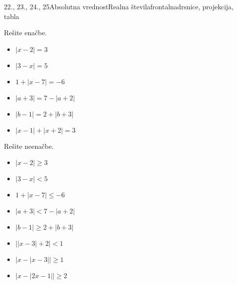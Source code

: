 \begin{priprava}{22., 23., 24., 25}{}{Absolutna vrednost}{Realna števila}{frontalna}{drsnice, projekcija, tabla}
\begin{multicols}{2}
\begin{naloga}
\begin{itemize}
    \end{itemize}
\end{naloga}


\begin{naloga}
    Rešite enačbe.
    \begin{itemize}
            \item $\left\lvert x-2 \right\rvert =3$ 
            \item $\left\lvert 3-x\right\rvert =5$ 
            \item $1+ \left\lvert x-7 \right\rvert =-6$ 
            \item $\left\lvert a+3 \right\rvert = 7- \left\lvert a+2 \right\rvert$ 
            \item $\left\lvert b-1 \right\rvert = 2 + \left\lvert b+3 \right\rvert$ 
            \item $\left\lvert x-1 \right\rvert + \left\lvert x+2 \right\rvert =3$ 

    \end{itemize}
\end{naloga}


\begin{naloga}
    Rešite neenačbe.
    \begin{itemize}
            \item $\left\lvert x-2 \right\rvert \geq 3$ 
            \item $\left\lvert 3-x\right\rvert <5$ 
            \item $1+ \left\lvert x-7 \right\rvert \leq-6$ 
            \item $\left\lvert a+3 \right\rvert < 7- \left\lvert a+2 \right\rvert$ 
            \item $\left\lvert b-1 \right\rvert \geq 2 + \left\lvert b+3 \right\rvert$ 
            \item $\left\lvert \lvert x-3\rvert +2\right\rvert <1$ 
            \item $\left\lvert x- \lvert x-3\rvert \right\rvert \geq 1$ 
            \item $\left\lvert x- \lvert 2x-1\rvert \right\rvert \geq 2$ 

    \end{itemize}
\end{naloga}

\end{multicols}

\end{priprava}
